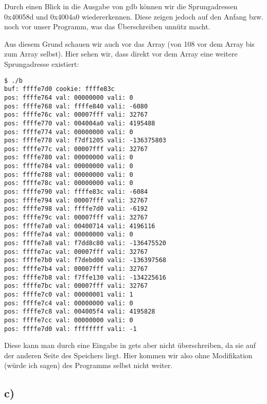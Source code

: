 \documentclass[10pt,a4paper]{article}
\begin{document}
Durch einen Blick in die Ausgabe von gdb können wir die Sprungadressen 0x40058d und 0x4004a0 wiedererkennen. Diese zeigen jedoch auf den Anfang bzw. noch vor unser Programm, was das Überschreiben unnütz macht.

Aus diesem Grund schauen wir auch vor das Array (von 108 vor dem Array bis zum Array selbst). Hier sehen wir, dass direkt vor dem Array eine weitere Sprungadresse existiert:
\begin{verbatim}
$ ./b
buf: ffffe7d0 cookie: ffffe83c
pos: ffffe764 val: 00000000 vali: 0
pos: ffffe768 val: ffffe840 vali: -6080
pos: ffffe76c val: 00007fff vali: 32767
pos: ffffe770 val: 004004a0 vali: 4195488
pos: ffffe774 val: 00000000 vali: 0
pos: ffffe778 val: f7df1205 vali: -136375803
pos: ffffe77c val: 00007fff vali: 32767
pos: ffffe780 val: 00000000 vali: 0
pos: ffffe784 val: 00000000 vali: 0
pos: ffffe788 val: 00000000 vali: 0
pos: ffffe78c val: 00000000 vali: 0
pos: ffffe790 val: ffffe83c vali: -6084
pos: ffffe794 val: 00007fff vali: 32767
pos: ffffe798 val: ffffe7d0 vali: -6192
pos: ffffe79c val: 00007fff vali: 32767
pos: ffffe7a0 val: 00400714 vali: 4196116
pos: ffffe7a4 val: 00000000 vali: 0
pos: ffffe7a8 val: f7dd8c80 vali: -136475520
pos: ffffe7ac val: 00007fff vali: 32767
pos: ffffe7b0 val: f7debd00 vali: -136397568
pos: ffffe7b4 val: 00007fff vali: 32767
pos: ffffe7b8 val: f7ffe130 vali: -134225616
pos: ffffe7bc val: 00007fff vali: 32767
pos: ffffe7c0 val: 00000001 vali: 1
pos: ffffe7c4 val: 00000000 vali: 0
pos: ffffe7c8 val: 004005f4 vali: 4195828
pos: ffffe7cc val: 00000000 vali: 0
pos: ffffe7d0 val: ffffffff vali: -1
\end{verbatim}

Diese kann man durch eine Eingabe in gets aber nicht überschreiben, da sie auf der anderen Seite des Speichers liegt. Hier kommen wir also ohne Modifikation (würde ich sagen) des Programms selbst nicht weiter.

\subsection*{c)}
\end{document}
